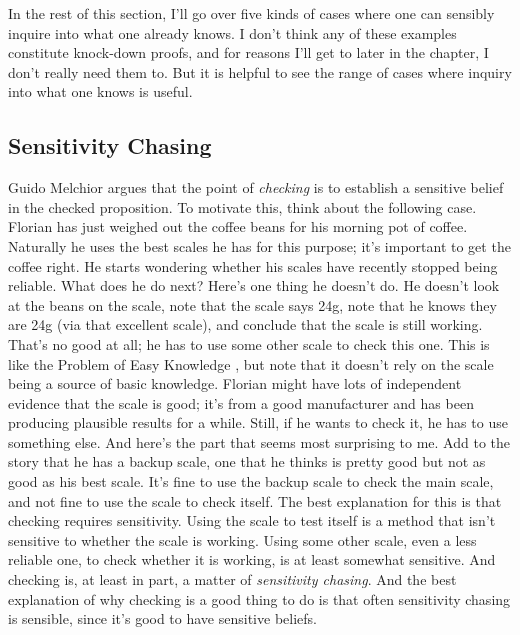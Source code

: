 \documentclass[
  11pt,
]{book}
\begin{document}
In the rest of this section, I'll go over five kinds of cases where one can sensibly inquire into what one already knows. I don't think any of these examples constitute knock-down proofs, and for reasons I'll get to later in the chapter, I don't really need them to. But it is helpful to see the range of cases where inquiry into what one knows is useful.

\hypertarget{sensitiveinquiry}{%
\subsection{Sensitivity Chasing}\label{sensitiveinquiry}}

Guido Melchior \citeyearpar{Melchior2019} argues that the point of \emph{checking} is to establish a sensitive belief in the checked proposition. To motivate this, think about the following case. Florian has just weighed out the coffee beans for his morning pot of coffee. Naturally he uses the best scales he has for this purpose; it's important to get the coffee right. He starts wondering whether his scales have recently stopped being reliable. What does he do next? Here's one thing he doesn't do. He doesn't look at the beans on the scale, note that the scale says 24g, note that he knows they are 24g (via that excellent scale), and conclude that the scale is still working. That's no good at all; he has to use some other scale to check this one. This is like the Problem of Easy Knowledge \citep{Cohen2002}, but note that it doesn't rely on the scale being a source of basic knowledge. Florian might have lots of independent evidence that the scale is good; it's from a good manufacturer and has been producing plausible results for a while. Still, if he wants to check it, he has to use something else. And here's the part that seems most surprising to me. Add to the story that he has a backup scale, one that he thinks is pretty good but not as good as his best scale. It's fine to use the backup scale to check the main scale, and not fine to use the scale to check itself. The best explanation for this is that checking requires sensitivity. Using the scale to test itself is a method that isn't sensitive to whether the scale is working. Using some other scale, even a less reliable one, to check whether it is working, is at least somewhat sensitive. And checking is, at least in part, a matter of \emph{sensitivity chasing}. And the best explanation of why checking is a good thing to do is that often sensitivity chasing is sensible, since it's good to have sensitive beliefs.
\end{document}
